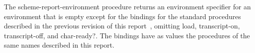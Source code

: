 \begin{entry}{%
}

  The {\cf scheme-report-environment} procedure returns
an environment specifier for an environment that is empty except for
the bindings for the standard procedures described in the previous
revision of this report~\cite{R5RS}, omitting {\cf load}, {\cf
  transcript-on}, {\cf transcript-off}, and {\cf char-ready?}.  The
bindings have as values the procedures of the same names described in
this report.
\end{entry}


